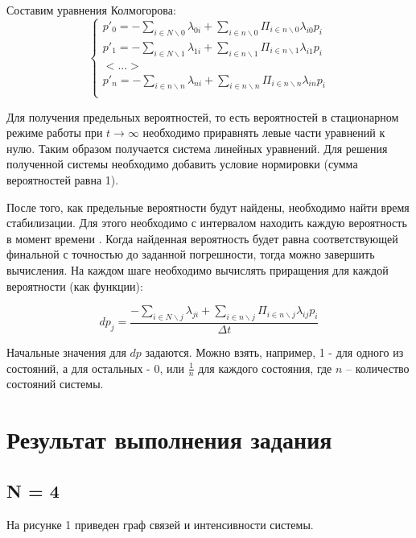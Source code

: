 Составим уравнения Колмогорова:
$$
\left\{\begin{matrix}
		p'_0 = -\sum_{i \in N \backslash 0} \lambda_{0i} + \sum_{i \in n \backslash 0} \Pi_{i \in n \backslash 0} \lambda_{i0}p_{i} \\
		p'_1 = -\sum_{i \in N \backslash 1} \lambda_{1i} + \sum_{i \in n \backslash 1} \Pi_{i \in n \backslash 1} \lambda_{i1}p_{i} \\
		<...>\\
		p'_n = -\sum_{i \in n \backslash n} \lambda_{ni} + \sum_{i \in n \backslash n} \Pi_{i \in n \backslash n} \lambda_{in}p_{i} \\
\end{matrix}\right.
$$



Для получения предельных вероятностей, то есть вероятностей в стационарном режиме работы при  $t \rightarrow \infty$ необходимо приравнять левые части уравнений к нулю. Таким образом получается система линейных уравнений. Для решения полученной системы необходимо добавить условие нормировки (сумма вероятностей равна 1). 

После того, как предельные вероятности будут найдены, необходимо найти время стабилизации. Для этого необходимо с интервалом  находить каждую вероятность в момент времени . Когда найденная вероятность будет равна соответствующей финальной с точностью до заданной погрешности, тогда можно завершить вычисления. На каждом шаге необходимо вычислять приращения для каждой вероятности (как функции): 

$$
dp_j = \frac{-\sum_{i \in N \backslash j} \lambda_{ji} + \sum_{i \in n \backslash j} \Pi_{i \in n \backslash j} \lambda_{ij}p_{i}}{\Delta t}
$$

Начальные значения для $dp$ задаются. Можно взять, например, 1 - для одного из состояний, а для остальных - 0, или $\frac{1}{n}$ для каждого состояния, где $n$ – количество состояний системы.





\section*{Результат выполнения задания}

\subsection*{N = 4}
На рисунке 1 приведен граф связей и интенсивности системы.


